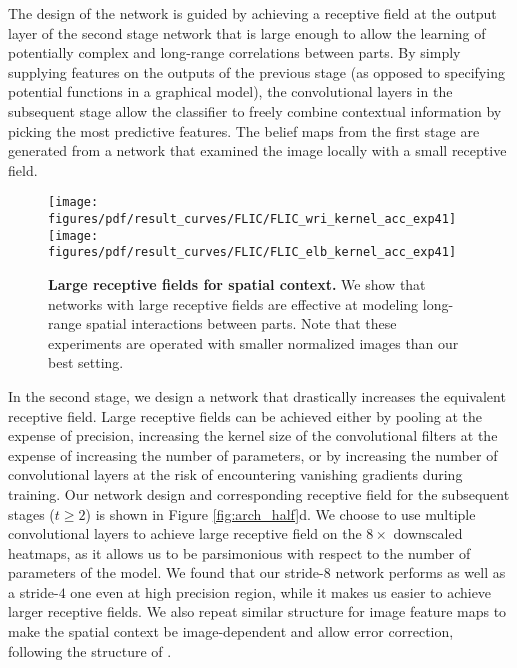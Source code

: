 \documentclass[10pt,twocolumn,letterpaper]{article}
\begin{document}
The design of the network is guided by achieving a receptive field at the output layer of the second stage network that is large enough to allow the learning of potentially complex and long-range correlations between parts. By simply supplying features on the outputs of the previous stage (as opposed to specifying potential functions in a graphical model), the convolutional layers in the subsequent stage allow the classifier to freely combine contextual information by picking the most predictive features. 
The belief maps from the first stage are generated from a network that examined the image locally with a small receptive field.
\begin{figure}[t!]
    \centering
    \texttt{[image: figures/pdf/result\_curves/FLIC/FLIC\_wri\_kernel\_acc\_exp41]}
    \texttt{[image: figures/pdf/result\_curves/FLIC/FLIC\_elb\_kernel\_acc\_exp41]}
    \caption{\textbf{Large receptive fields for spatial context.} We show that networks with large receptive fields are effective at modeling long-range spatial interactions between parts. Note that these experiments are operated with smaller normalized images than our best setting.}
    \label{fig:flic_kernels}
\end{figure}%
In the second stage, we design a network that drastically increases the equivalent receptive field. 
Large receptive fields can be achieved either by pooling at the expense of precision, increasing the kernel size of the convolutional filters at the expense of increasing the number of parameters, or by increasing the number of convolutional layers at the risk of encountering vanishing gradients during training. 
Our network design and corresponding receptive field for the subsequent stages ($t \geq 2$) is shown in Figure \ref{fig:arch_half}d.
We choose to use multiple convolutional layers to achieve large receptive field on the $8\times$ downscaled heatmaps, as it allows us to be parsimonious with respect to the number of parameters of the model. We found that our stride-$8$ network performs as well as a stride-$4$ one even at high precision region, while it makes us easier to achieve larger receptive fields.
We also repeat similar structure for image feature maps to make the spatial context be image-dependent and allow error correction, following the structure of \posemachine.
\end{document}

